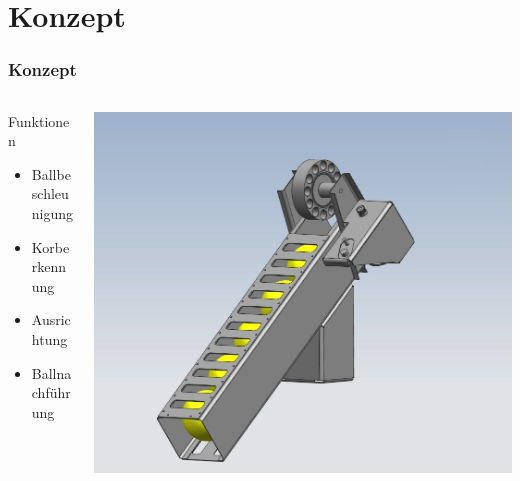 \section{Konzept} %
\begin{frame}
    \frametitle{Konzept}
    \begin{columns}
        \begin{column}{0.4\textwidth}
            \begin{block}{Funktionen}
                \begin{itemize}
                    \item<2-> Ballbeschleunigung
                    \item<3-> Korberkennung
                    \item<4-> Ausrichtung
                    \item<5-> Ballnachführung
                \end{itemize}
            \end{block}
        \end{column}
        \begin{column}{0.6\textwidth}
            \includegraphics[width=\textwidth]{../doc/fig/Balllager.jpg}
        \end{column}
    \end{columns}
\end{frame}
